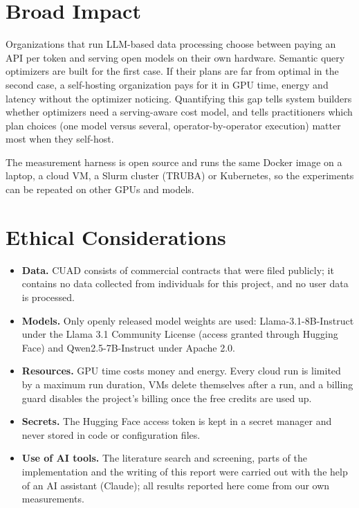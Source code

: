 \documentclass[a4paper,12pt]{report}
\begin{document}
\section{Broad Impact}

Organizations that run LLM-based data processing choose between paying an API per token and serving
open models on their own hardware. Semantic query optimizers are built for the first case. If their
plans are far from optimal in the second case, a self-hosting organization pays for it in GPU time,
energy and latency without the optimizer noticing. Quantifying this gap tells system builders whether
optimizers need a serving-aware cost model, and tells practitioners which plan choices (one model
versus several, operator-by-operator execution) matter most when they self-host.

The measurement harness is open source and runs the same Docker image on a laptop, a cloud VM, a
Slurm cluster (TRUBA) or Kubernetes, so the experiments can be repeated on other GPUs and models.

\section{Ethical Considerations}

\begin{itemize}
\item \textbf{Data.} CUAD \cite{hendrycks2021cuad} consists of commercial contracts that were filed
publicly; it contains no data collected from individuals for this project, and no user data is
processed.
\item \textbf{Models.} Only openly released model weights are used: Llama-3.1-8B-Instruct under the
Llama 3.1 Community License (access granted through Hugging Face) and Qwen2.5-7B-Instruct under
Apache 2.0.
\item \textbf{Resources.} GPU time costs money and energy. Every cloud run is limited by a maximum run
duration, VMs delete themselves after a run, and a billing guard disables the project's billing once
the free credits are used up.
\item \textbf{Secrets.} The Hugging Face access token is kept in a secret manager and never stored in
code or configuration files.
\item \textbf{Use of AI tools.} The literature search and screening, parts of the implementation and
the writing of this report were carried out with the help of an AI assistant (Claude); all results
reported here come from our own measurements.
\end{itemize}
\end{document}
